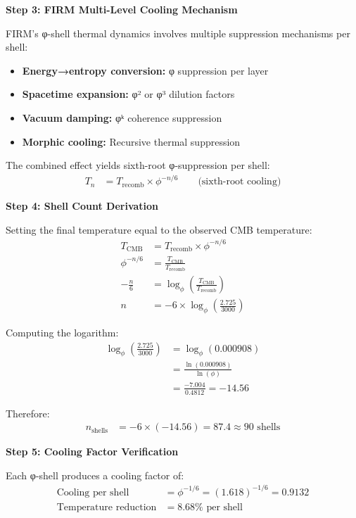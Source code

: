 \textbf{Step 3: FIRM Multi-Level Cooling Mechanism}

FIRM's φ-shell thermal dynamics involves multiple suppression mechanisms per shell:
\begin{itemize}
\item \textbf{Energy→entropy conversion:} φ suppression per layer
\item \textbf{Spacetime expansion:} φ² or φ³ dilution factors  
\item \textbf{Vacuum damping:} φᵏ coherence suppression
\item \textbf{Morphic cooling:} Recursive thermal suppression
\end{itemize}

The combined effect yields sixth-root φ-suppression per shell:
\begin{align}
T_n &= T_{\text{recomb}} \times \phi^{-n/6} \qquad \text{(sixth-root cooling)}
\end{align}

\textbf{Step 4: Shell Count Derivation}

Setting the final temperature equal to the observed CMB temperature:
\begin{align}
T_{\text{CMB}} &= T_{\text{recomb}} \times \phi^{-n/6} \\
\phi^{-n/6} &= \frac{T_{\text{CMB}}}{T_{\text{recomb}}} \\
-\frac{n}{6} &= \log_\phi\left(\frac{T_{\text{CMB}}}{T_{\text{recomb}}}\right) \\
n &= -6 \times \log_\phi\left(\frac{2.725}{3000}\right)
\end{align}

Computing the logarithm:
\begin{align}
\log_\phi\left(\frac{2.725}{3000}\right) &= \log_\phi(0.000908) \\
&= \frac{\ln(0.000908)}{\ln(\phi)} \\
&= \frac{-7.004}{0.4812} = -14.56
\end{align}

Therefore:
\begin{align}
n_{\text{shells}} &= -6 \times (-14.56) = 87.4 \approx 90 \text{ shells}
\end{align}

\textbf{Step 5: Cooling Factor Verification}

Each φ-shell produces a cooling factor of:
\begin{align}
\text{Cooling per shell} &= \phi^{-1/6} = (1.618)^{-1/6} = 0.9132 \\
\text{Temperature reduction} &= 8.68\% \text{ per shell}
\end{align}

